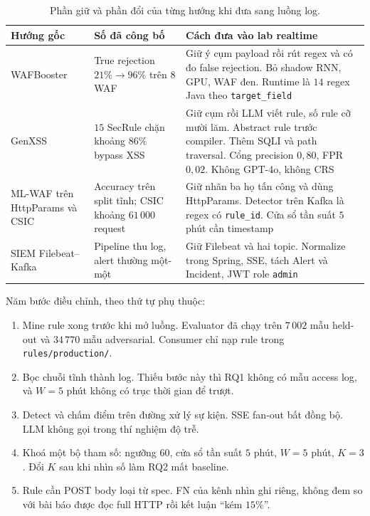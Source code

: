 \documentclass[a4paper,11pt]{article}
\begin{document}
\begin{table}[ht]
\centering
\caption{Phần giữ và phần đổi của từng hướng khi đưa sang luồng log.}
\label{tab:adapt}
\small
\begin{tabularx}{\linewidth}{@{}p{2.55cm}p{3.15cm}Y@{}}
\toprule
Hướng gốc & Số đã công bố & Cách đưa vào lab realtime \\
\midrule
WAFBooster \cite{wafbooster} & True rejection $21\% \rightarrow 96\%$ trên $8$ WAF & Giữ ý cụm payload rồi rút regex và có đo false rejection. Bỏ shadow RNN, GPU, WAF đen. Runtime là $14$ regex Java theo \texttt{target\_field} \\
GenXSS \cite{genxss} & $15$ SecRule chặn khoảng $86\%$ bypass XSS & Giữ cụm rồi LLM viết rule, số rule cỡ mười lăm. Abstract rule trước compiler. Thêm SQLI và path traversal. Cổng precision $0{,}80$, FPR $0{,}02$. Không GPT-4o, không CRS \\
ML-WAF trên HttpParams và CSIC & Accuracy trên split tĩnh; CSIC khoảng $61\,000$ request & Giữ nhãn ba họ tấn công và dùng HttpParams. Detector trên Kafka là regex có \texttt{rule\_id}. Cửa sổ tần suất $5$ phút cần timestamp \\
SIEM Filebeat--Kafka & Pipeline thu log, alert thường một-một & Giữ Filebeat và hai topic. Normalize trong Spring, SSE, tách Alert và Incident, JWT role \texttt{admin} \\
\bottomrule
\end{tabularx}
\end{table}

Năm bước điều chỉnh, theo thứ tự phụ thuộc:

\begin{enumerate}
\item Mine rule xong trước khi mở luồng. Evaluator đã chạy trên $7\,002$ mẫu held-out và $34\,770$ mẫu adversarial. Consumer chỉ nạp rule trong \texttt{rules/production/}.
\item Bọc chuỗi tĩnh thành log. Thiếu bước này thì RQ1 không có mẫu access log, và $W{=}5$ phút không có trục thời gian để trượt.
\item Detect và chấm điểm trên đường xử lý sự kiện. SSE fan-out bất đồng bộ. LLM không gọi trong thí nghiệm độ trễ.
\item Khoá một bộ tham số: ngưỡng $60$, cửa sổ tần suất $5$ phút, $W{=}5$ phút, $K{=}3$. Đổi $K$ sau khi nhìn số làm RQ2 mất baseline.
\item Rule cần POST body loại từ spec. FN của kênh nhìn ghi riêng, không đem so với bài báo được đọc full HTTP rồi kết luận ``kém $15\%$''.
\end{enumerate}
\end{document}
